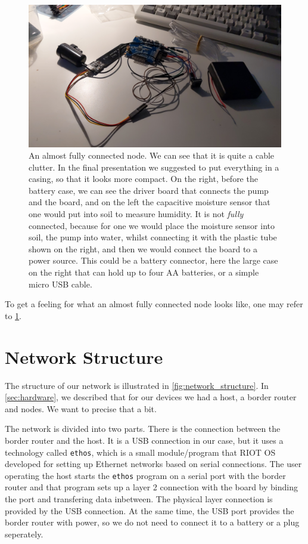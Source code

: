 \documentclass[acmtog, language=english, nonacm]{acmart}
\begin{document}
    \begin{figure}[!hbtp]
        \centering
        \includegraphics[angle=180, width=\linewidth]{img/almost_fully_connected_node.jpg}
        \caption{An almost fully connected node. We can see that it is quite a cable clutter. In the final presentation we suggested to put everything in a casing, so that it looks more compact. On the right, before the battery case, we can see the driver board that connects the pump and the board, and on the left the capacitive moisture sensor that one would put into soil to measure humidity. It is not \emph{fully} connected, because for one we would place the moisture sensor into soil, the pump into water, whilst connecting it with the plastic tube shown on the right, and then we would connect the board to a power source. This could be a battery connector, here the large case on the right that can hold up to four AA batteries, or a simple micro USB cable.}
        \label{fig:almost_fully_connected_node}
    \end{figure}

    To get a feeling for what an almost fully connected node looks like, one may refer to \cref{fig:almost_fully_connected_node}.

    \section{Network Structure} \label{sec:network_structure} 

    The structure of our network is illustrated in \cref{fig:network_structure}. In \cref{sec:hardware}, we described that for our devices we had a host, a border router and nodes. We want to precise that a bit.

    The network is divided into two parts. There is the connection between the border router and the host. It is a USB connection in our case, but it uses a technology called \texttt{ethos}, which is a small module/program that RIOT OS developed for setting up Ethernet networks based on serial connections. The user operating the host starts the \texttt{ethos} program on a serial port with the border router and that program sets up a layer 2 connection with the board by binding the port and transfering data inbetween. The physical layer connection is provided by the USB connection. At the same time, the USB port provides the border router with power, so we do not need to connect it to a battery or a plug seperately.
\end{document}

